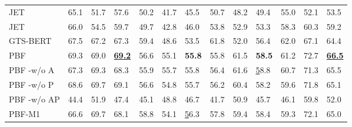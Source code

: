\documentclass[11pt]{article}
\begin{document}
\begin{table*}
\begin{tabular}{|l|lll|lll|lll|lll|}
		JET & 65.1                  & 51.7                  & 57.6                    & 50.2                  & 41.7                  & 45.5                    & 50.7                  & 48.2                  & 49.4                    & 55.0                  & 52.1                  & 53.5                    \\
		JET & 66.0                  & 54.5                  & 59.7                    & 49.7                  & 42.8                  & 46.0                    & 53.8                  & 52.9                  & 53.3                    & 58.3                  & 60.3                  & 59.2                    \\
		GTS-BERT        & 67.5                  & 67.2                  & 67.3                    & 59.4                  & 48.6                  & 53.5                    & 61.8                  & 52.0                  & 56.4                    & 62.0                  & 67.1                  & 64.4                    \\ \hline
		PBF             & 69.3                  & 69.0                  & {\ul \textbf{69.2}}     & 56.6                  & 55.1                  & \textbf{55.8}           & 55.8                  & 61.5                  & \textbf{58.5}           & 61.2                  & 72.7                  & {\ul \textbf{66.5}}     \\
		PBF -w/o A      & 67.3                  & 69.3                  & 68.3                    & 55.9                  & 55.7                  & 55.8                    & 56.4                  & 61.6                  & {\ul 58.8}              & 60.7                  & 71.3                  & 65.5                    \\
		PBF -w/o P      & 68.6                  & 69.7                  & 69.1                    & 56.6                  & 54.8                  & 55.7                    & 56.2                  & 60.4                  & 58.2                    & 59.6                  & 71.8                  & 65.1                    \\
		PBF -w/o AP     & 44.4                  & 51.9                  & 47.4                    & 45.1                  & 48.8                  & 46.7                    & 41.7                  & 50.9                  & 45.7                    & 46.1                  & 59.8                  & 52.0                    \\
		PBF-M1          & 66.6                  & 69.7                  & 68.1                    & 58.8                  & 54.1                  & {\ul 56.3}              & 57.8                  & 59.4                  & 58.4                    & 59.3                  & 72.1                  & 65.0                    \\

\end{tabular}
\end{table*}
\end{document}
